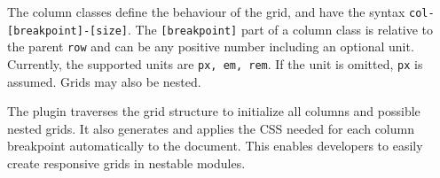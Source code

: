 \documentclass[]{llncs}
\newcommand{\code}[1]{\texttt{#1}}
\begin{document}
    The column classes define the behaviour of the grid, and have the syntax \code{col-[breakpoint]-[size]}.
    The \code{[breakpoint]} part of a column class is relative to the parent \code{row} and can be any positive number including an optional unit.
    Currently, the supported units are \code{px, em, rem}.
    If the unit is omitted, \code{px} is assumed.
    Grids may also be nested.

    The plugin traverses the grid structure to initialize all columns and possible nested grids.
    It also generates and applies the CSS needed for each column breakpoint automatically to the document.
    This enables developers to easily create responsive grids in nestable modules.
\end{document}
